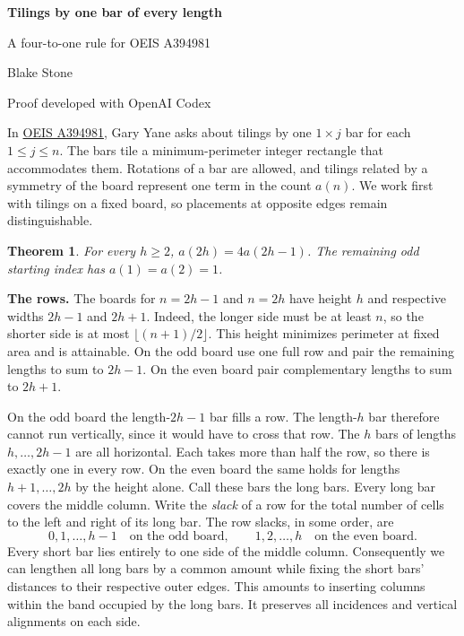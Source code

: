 \documentclass[11pt,letterpaper]{article}
\newtheorem{theorem}{Theorem}
\begin{document}
\enlargethispage{2\baselineskip}
\begin{center}
{\LARGE\bfseries Tilings by one bar of every length}\par\vspace{7pt}
{\large A four-to-one rule for OEIS A394981}\par\vspace{9pt}
Blake Stone\par{\small Proof developed with OpenAI Codex}
\end{center}

In \href{https://oeis.org/A394981}{OEIS A394981}, Gary Yane asks about tilings by one $1\times j$ bar for each $1\le j\le n$. The bars tile a minimum-perimeter integer rectangle that accommodates them. Rotations of a bar are allowed, and tilings related by a symmetry of the board represent one term in the count $a(n)$. We work first with tilings on a fixed board, so placements at opposite edges remain distinguishable.

\begin{theorem} For every $h\ge2$, $a(2h)=4a(2h-1)$. The remaining odd starting index has $a(1)=a(2)=1$.\end{theorem}

\noindent\textbf{The rows.}
The boards for $n=2h-1$ and $n=2h$ have height $h$ and respective widths $2h-1$ and $2h+1$. Indeed, the longer side must be at least $n$, so the shorter side is at most $\lfloor(n+1)/2\rfloor$. This height minimizes perimeter at fixed area and is attainable. On the odd board use one full row and pair the remaining lengths to sum to $2h-1$. On the even board pair complementary lengths to sum to $2h+1$.

On the odd board the length-$2h-1$ bar fills a row. The length-$h$ bar therefore cannot run vertically, since it would have to cross that row. The $h$ bars of lengths $h,\ldots,2h-1$ are all horizontal. Each takes more than half the row, so there is exactly one in every row. On the even board the same holds for lengths $h+1,\ldots,2h$ by the height alone. Call these bars the long bars. Every long bar covers the middle column. Write the \emph{slack} of a row for the total number of cells to the left and right of its long bar. The row slacks, in some order, are
\[
    0,1,\ldots,h-1 \quad\text{on the odd board},\qquad
    1,2,\ldots,h   \quad\text{on the even board}.
\]
Every short bar lies entirely to one side of the middle column. Consequently we can lengthen all long bars by a common amount while fixing the short bars' distances to their respective outer edges. This amounts to inserting columns within the band occupied by the long bars. It preserves all incidences and vertical alignments on each side.
\end{document}
